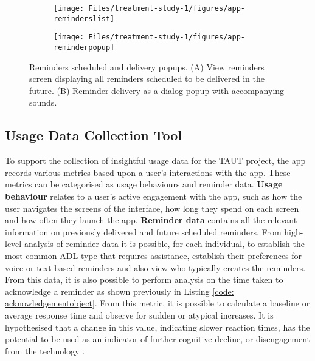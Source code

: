 \begin{figure}[]
    \centering
    \begin{subfigure}[t]{0.48\textwidth}
        \centering
       \texttt{[image: Files/treatment-study-1/figures/app-reminderslist]}
        \caption{}
        \label{fig: taut-reminderslist}
    \end{subfigure}
    \hfill
     \begin{subfigure}[t]{0.48\textwidth}
        \centering
      \texttt{[image: Files/treatment-study-1/figures/app-reminderpopup]}
        \caption{}
        \label{fig: taut-reminderpopup}
    \end{subfigure}
      \caption{Reminders scheduled and delivery popups. (A) View reminders screen displaying all reminders scheduled to be delivered in the future. (B) Reminder delivery as a dialog popup with accompanying sounds.}
    \label{fig: taut-reminderlist-delivery}
\end{figure}


\subsection{Usage Data Collection Tool}
To support the collection of insightful usage data for the TAUT project, the app records various metrics based upon a user’s interactions with the app. These metrics can be categorised as usage behaviours and reminder data.
\newline \textbf{Usage behaviour} relates to a user’s active engagement with the app, such as how the user navigates the screens of the interface, how long they spend on each screen and how often they launch the app.
\newline \textbf{Reminder data} contains all the relevant information on previously delivered and future scheduled reminders. From high-level analysis of reminder data it is possible, for each individual, to establish the most common ADL type that requires assistance, establish their preferences for voice or text-based reminders and also view who typically creates the reminders.
From this data, it is also possible to perform analysis on the time taken to acknowledge a reminder as shown previously in Listing \ref{code: acknowledgementobject}. From this metric, it is possible to calculate a baseline or average response time and observe for sudden or atypical increases. It is hypothesised that a change in this value, indicating slower reaction times, has the potential to be used as an indicator of further cognitive decline, or disengagement from the technology \cite{Phillips2013}.

